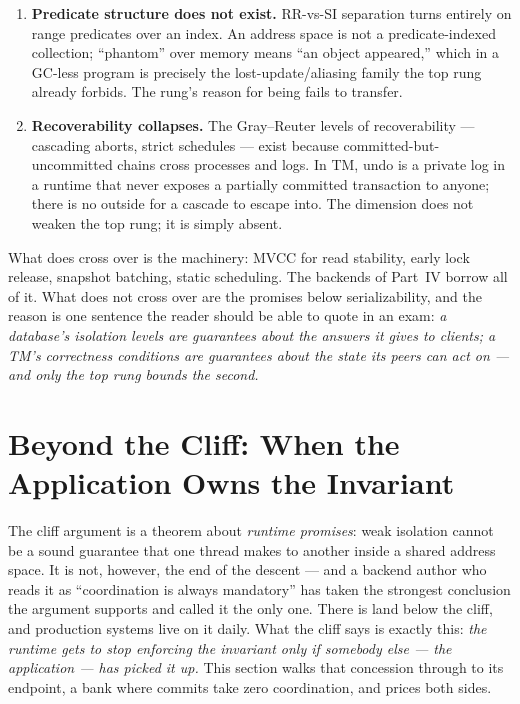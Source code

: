 \begin{enumerate}
\item \textbf{Predicate structure does not exist.} RR-vs-SI separation turns
entirely on range predicates over an index. An address space is not a
predicate-indexed collection; ``phantom'' over memory means ``an object
appeared,'' which in a GC-less program is precisely the lost-update/aliasing
family the top rung already forbids. The rung's reason for being fails to
transfer.

\item \textbf{Recoverability collapses.} The Gray--Reuter levels of
recoverability --- cascading aborts, strict schedules
\cite{gray93tp} --- exist because committed-but-uncommitted chains cross
processes and logs. In TM, undo is a private log in a runtime that never
exposes a partially committed transaction to anyone; there is no outside for
a cascade to escape into. The dimension does not weaken the top rung; it is
simply absent.
\end{enumerate}

What does cross over is the machinery: MVCC for read stability, early lock
release, snapshot batching, static scheduling. The backends of Part~IV borrow
all of it. What does not cross over are the promises below serializability,
and the reason is one sentence the reader should be able to quote in an exam:
\emph{a database's isolation levels are guarantees about the answers it gives
to clients; a TM's correctness conditions are guarantees about the state its
peers can act on --- and only the top rung bounds the second.}

\section{Beyond the Cliff: When the Application Owns the Invariant}
\label{sec:iso-beyond-cliff}

The cliff argument is a theorem about \emph{runtime promises}: weak isolation
cannot be a sound guarantee that one thread makes to another inside a shared
address space. It is not, however, the end of the descent --- and a backend
author who reads it as ``coordination is always mandatory'' has taken the
strongest conclusion the argument supports and called it the only one. There
is land below the cliff, and production systems live on it daily. What the
cliff says is exactly this: \emph{the runtime gets to stop enforcing the
invariant only if somebody else --- the application --- has picked it up.}
This section walks that concession through to its endpoint, a bank where
commits take zero coordination, and prices both sides.

